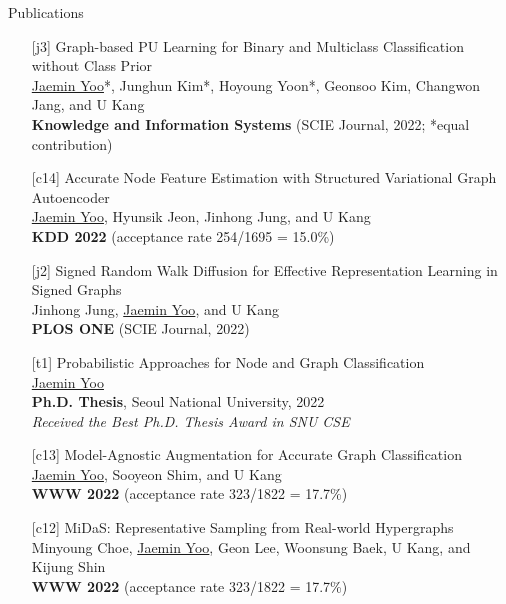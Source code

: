 \documentclass{resume} %
\begin{document}

\begin{rSection}{Publications}
\smallskip
\begin{enumerate}

	\item[{[j3]}]
		Graph-based PU Learning for Binary and Multiclass Classification without Class Prior \\
		\underline{Jaemin Yoo}*, Junghun Kim*, Hoyoung Yoon*, Geonsoo Kim, Changwon Jang, and U Kang \\
		\textbf{Knowledge and Information Systems} (SCIE Journal, 2022; *equal contribution) \\

	\item[{[c14]}]
		Accurate Node Feature Estimation with Structured Variational Graph Autoencoder \\
		\underline{Jaemin Yoo}, Hyunsik Jeon, Jinhong Jung, and U Kang \\
		\textbf{KDD 2022} (acceptance rate 254/1695 = 15.0\%) \\

	\item[{[j2]}]
		Signed Random Walk Diffusion for Effective Representation Learning in Signed Graphs \\
		Jinhong Jung, \underline{Jaemin Yoo}, and U Kang \\
		\textbf{PLOS ONE} (SCIE Journal, 2022)

	\item[{[t1]}]
		Probabilistic Approaches for Node and Graph Classification \\
		\underline{Jaemin Yoo} \\
		\textbf{Ph.D. Thesis}, Seoul National University, 2022 \\
		\emph{Received the Best Ph.D. Thesis Award in SNU CSE}

	\item[{[c13]}]
		Model-Agnostic Augmentation for Accurate Graph Classification \\
		\underline{Jaemin Yoo}, Sooyeon Shim, and U Kang \\
		\textbf{WWW 2022} (acceptance rate 323/1822 = 17.7\%) \\

	\item[{[c12]}]
		MiDaS: Representative Sampling from Real-world Hypergraphs \\
		Minyoung Choe, \underline{Jaemin Yoo}, Geon Lee, Woonsung Baek, U Kang, and Kijung Shin \\
		\textbf{WWW 2022} (acceptance rate 323/1822 = 17.7\%) \\


\end{enumerate}
\end{rSection}
\end{document}
